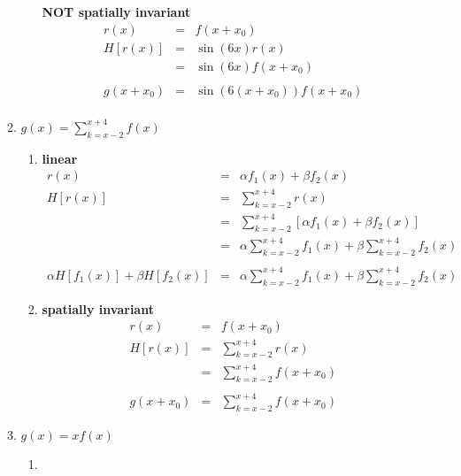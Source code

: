 \documentclass[9pt]{article}
\begin{document}
\begin{enumerate}
\begin{enumerate}
\begin{enumerate}
            \textbf{NOT spatially invariant}
            \begin{eqnarray*}
              r(x) &=& f(x + x_0) \\
              H[r(x)] &=& \sin(6x) r(x) \\
                      &=& \sin(6x) f(x + x_0) \\
              \\
              g(x + x_0) &=& \sin(6(x + x_0)) f(x + x_0) \\
            \end{eqnarray*}
          \end{enumerate}
        \item
          $ g(x) = \sum_{k = x - 2}^{x + 4} f(x) $
          \begin{enumerate}
          \item
            \textbf{linear}
            \begin{eqnarray*}
              r(x) &=& \alpha f_1(x) + \beta f_2(x) \\
              H[r(x)] &=& \sum_{k=x-2}^{x+4} r(x) \\
                      &=& \sum_{k=x-2}^{x+4} [\alpha f_1(x) + \beta f_2(x)] \\
                      &=& \alpha \sum_{k=x-2}^{x+4} f_1(x) +
                          \beta \sum_{k=x-2}^{x+4} f_2(x) \\
              \\
              \alpha H[f_1(x)] + \beta H[f_2(x)]
                      &=& \alpha \sum_{k=x-2}^{x+4} f_1(x) +
                          \beta \sum_{k=x-2}^{x+4} f_2(x)
            \end{eqnarray*}
          \item
            \textbf{spatially invariant}
            \begin{eqnarray*}
              r(x) &=& f(x + x_0) \\
              H[r(x)] &=& \sum_{k=x-2}^{x+4} r(x) \\
                      &=& \sum_{k=x-2}^{x+4} f(x + x_0) \\
              \\
              g(x + x_0) &=& \sum_{k=x-2}^{x+4} f(x + x_0)
            \end{eqnarray*}
          \end{enumerate}
        \item
          $ g(x) = xf(x) $
          \begin{enumerate}
          \item

\end{enumerate}
\end{enumerate}
\end{enumerate}
\end{document}
